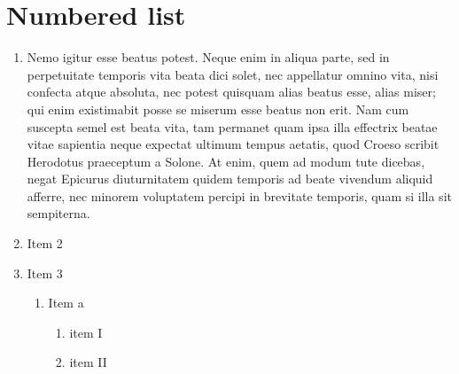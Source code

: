 \documentclass[twoside]{extreport}
\begin{document}
\hypertarget{numbered-list}{%
\section{Numbered list}\label{numbered-list}}

\begin{enumerate}
\def\labelenumi{\arabic{enumi}.}
\tightlist
\item
  Nemo igitur esse beatus potest. Neque enim in aliqua parte, sed in
  perpetuitate temporis vita beata dici solet, nec appellatur omnino
  vita, nisi confecta atque absoluta, nec potest quisquam alias beatus
  esse, alias miser; qui enim existimabit posse se miserum esse beatus
  non erit. Nam cum suscepta semel est beata vita, tam permanet quam
  ipsa illa effectrix beatae vitae sapientia neque expectat ultimum
  tempus aetatis, quod Croeso scribit Herodotus praeceptum a Solone. At
  enim, quem ad modum tute dicebas, negat Epicurus diuturnitatem quidem
  temporis ad beate vivendum aliquid afferre, nec minorem voluptatem
  percipi in brevitate temporis, quam si illa sit sempiterna.
\item
  Item 2
\item
  Item 3

  \begin{enumerate}
  \def\labelenumii{\arabic{enumii}.}
  \tightlist
  \item
    Item a

    \begin{enumerate}
    \def\labelenumiii{\arabic{enumiii}.}
    \tightlist
    \item
      item I
    \item
      item II


\end{enumerate}
\end{enumerate}
\end{enumerate}
\end{document}
